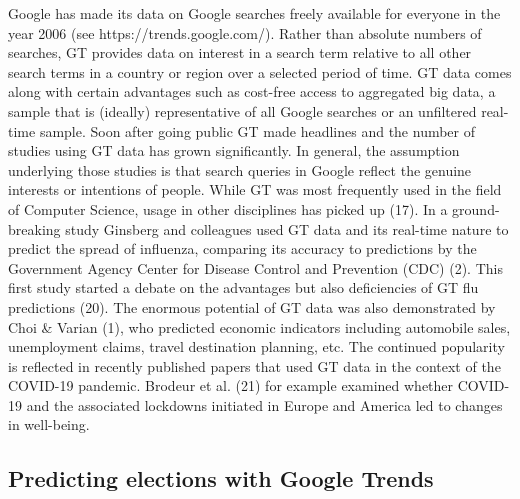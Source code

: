 \documentclass[
  letterpaper,
  DIV=11,
  numbers=noendperiod]{scrartcl}
\begin{document}
Google has made its data on Google searches freely available for
everyone in the year 2006 (see https://trends.google.com/). Rather than
absolute numbers of searches, GT provides data on interest in a search
term relative to all other search terms in a country or region over a
selected period of time. GT data comes along with certain advantages
such as cost-free access to aggregated big data, a sample that is
(ideally) representative of all Google searches or an unﬁltered
real-time sample. Soon after going public GT made headlines and the
number of studies using GT data has grown significantly. In general, the
assumption underlying those studies is that search queries in Google
reﬂect the genuine interests or intentions of people. While GT was most
frequently used in the ﬁeld of Computer Science, usage in other
disciplines has picked up (17). In a ground-breaking study Ginsberg and
colleagues used GT data and its real-time nature to predict the spread
of inﬂuenza, comparing its accuracy to predictions by the Government
Agency Center for Disease Control and Prevention (CDC) (2). This first
study started a debate on the advantages but also deficiencies of GT flu
predictions (20). The enormous potential of GT data was also
demonstrated by Choi \& Varian (1), who predicted economic indicators
including automobile sales, unemployment claims, travel destination
planning, etc. The continued popularity is reﬂected in recently
published papers that used GT data in the context of the COVID-19
pandemic. Brodeur et al. (21) for example examined whether COVID-19 and
the associated lockdowns initiated in Europe and America led to changes
in well-being.

\hypertarget{predicting-elections-with-google-trends}{%
\subsection{Predicting elections with Google
Trends}\label{predicting-elections-with-google-trends}}
\end{document}
